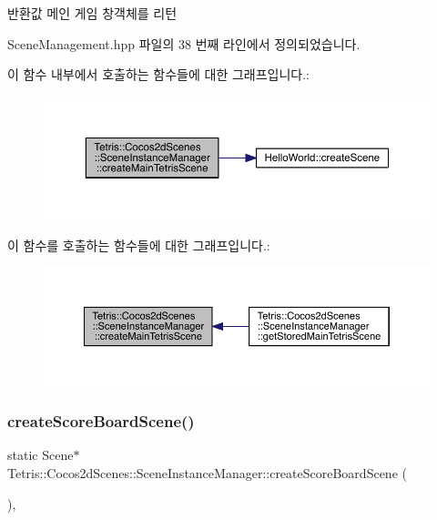 \begin{DoxyReturn}{반환값}
메인 게임 창객체를 리턴 
\end{DoxyReturn}


Scene\+Management.\+hpp 파일의 38 번째 라인에서 정의되었습니다.

이 함수 내부에서 호출하는 함수들에 대한 그래프입니다.\+:
\nopagebreak
\begin{figure}[H]
\begin{center}
\leavevmode
\includegraphics[width=350pt]{class_tetris_1_1_cocos2d_scenes_1_1_scene_instance_manager_a536188c1cdb7cb46ebd2edc8ebf1f17a_cgraph}
\end{center}
\end{figure}
이 함수를 호출하는 함수들에 대한 그래프입니다.\+:
\nopagebreak
\begin{figure}[H]
\begin{center}
\leavevmode
\includegraphics[width=350pt]{class_tetris_1_1_cocos2d_scenes_1_1_scene_instance_manager_a536188c1cdb7cb46ebd2edc8ebf1f17a_icgraph}
\end{center}
\end{figure}
\mbox{\label{class_tetris_1_1_cocos2d_scenes_1_1_scene_instance_manager_a159ac191291a7cc3575d6f5790df6646}} 
\subsubsection{\texorpdfstring{create\+Score\+Board\+Scene()}{createScoreBoardScene()}}
{\footnotesize\ttfamily static Scene$\ast$ Tetris\+::\+Cocos2d\+Scenes\+::\+Scene\+Instance\+Manager\+::create\+Score\+Board\+Scene (\begin{DoxyParamCaption}{ }\end{DoxyParamCaption})\hspace{0.3cm}{\ttfamily [inline]}, {\ttfamily [static]}}

